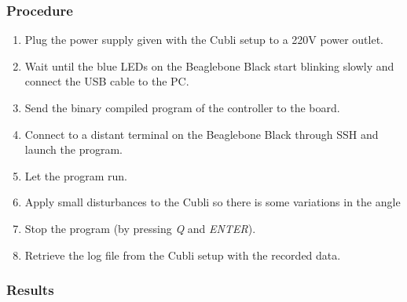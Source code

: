 \subsubsection{Procedure}
\begin{enumerate}
	  \item Plug the power supply given with the Cubli setup to a \si{220}{V} power outlet.
	  \item Wait until the blue LEDs on the Beaglebone Black start blinking slowly and connect the USB cable to the PC.
	  \item Send the binary compiled program of the controller to the board.
	  \item Connect to a distant terminal on the Beaglebone Black through SSH and launch the program.
	  \item Let the program run.
	  \item Apply small disturbances to the Cubli so there is some variations in the angle
	  \item Stop the program (by pressing \textit{Q} and \textit{ENTER}).
	  \item Retrieve the log file from the Cubli setup with the recorded data.
\end{enumerate}

\subsubsection{Results}
%
%
%

